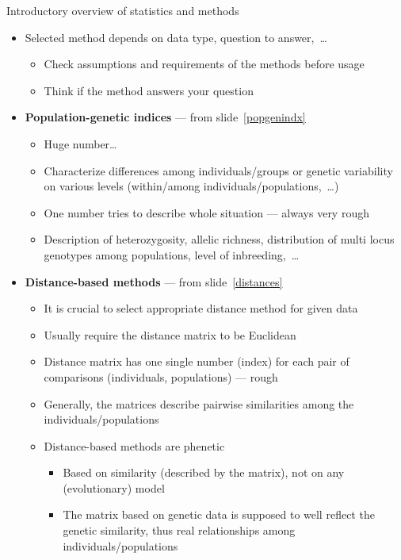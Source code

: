 \documentclass[compress, ucs, xelatex, 11pt, xcolor=svgnames,
  hyperref={
    bookmarks=true,
    unicode=true,
    colorlinks=true,
    pdftitle={Molecular data in R},
    plainpages=false,
    pdfauthor={Vojtech Zeisek},
    pdfsubject={Course about phylogeny and evolution in R},
    pdfcreator={XeLaTeX},
    pdfkeywords={R, evolution, phylogeny, molecular data},
    linkcolor=Tomato,
    anchorcolor=SaddleBrown,
    citecolor=Goldenrod,
    filecolor=DarkMagenta,
    menucolor=Sienna,
    urlcolor=DarkTurquoise,
    pdftex},
  url={hyphens, lowtilde} %
  ]{beamer}
\begin{document}
\begin{frame}[allowframebreaks]{Introductory overview of statistics and methods}
  \begin{itemize}
    \item \alert{Selected method depends on data type, question to answer,~\ldots}
    \begin{itemize}
      \item Check assumptions and requirements of the methods before usage
      \item Think if the method answers your question
    \end{itemize}
    \item \textbf{Population-genetic indices} --- from slide~\ref{popgenindx}
    \begin{itemize}
      \item Huge number\ldots
      \item Characterize differences among individuals/groups or genetic variability on various levels (within/among individuals/populations,~\ldots)
      \item One number tries to describe whole situation --- always very rough
      \item Description of heterozygosity, allelic richness, distribution of multi locus genotypes among populations, level of inbreeding,~\ldots
    \end{itemize}
    \item \textbf{Distance-based methods} --- from slide~\ref{distances}
    \begin{itemize}
      \item \alert{It is crucial to select appropriate distance method for given data}
      \item Usually require the distance matrix to be Euclidean
      \item Distance matrix has one single number (index) for each pair of comparisons (individuals, populations) --- rough
      \item Generally, the matrices describe pairwise similarities among the individuals/populations
      \item Distance-based methods are phenetic
      \begin{itemize}
	\item Based on similarity (described by the matrix), not on any (evolutionary) model
	\item The matrix based on genetic data is supposed to well reflect the genetic similarity, thus real relationships among individuals/populations

\end{itemize}
\end{itemize}
\end{itemize}
\end{frame}
\end{document}
